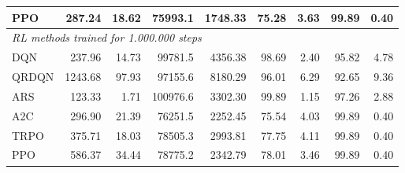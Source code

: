 \begin{samepage}
\begin{center}
\begin{tabular}{l|rr|rr|rr|rr}
    PPO          &   287.24 &    18.62 &    75993.1 &    1748.33 &   75.28 &    3.63 &   99.89 &    0.40 \\
    \midrule
    \multicolumn{9}{l}{\textit{RL methods trained for 1.000.000 steps}} \\
    \midrule
    DQN          &   237.96 &    14.73 &    99781.5 &    4356.38 &   98.69 &    2.40 &   95.82 &    4.78 \\
    QRDQN        &  1243.68 &    97.93 &    97155.6 &    8180.29 &   96.01 &    6.29 &   92.65 &    9.36 \\
    ARS          &   123.33 &     1.71 &   100976.6 &    3302.30 &   99.89 &    1.15 &   97.26 &    2.88 \\
    A2C          &   296.90 &    21.39 &    76251.5 &    2252.45 &   75.54 &    4.03 &   99.89 &    0.40 \\
    TRPO         &   375.71 &    18.03 &    78505.3 &    2993.81 &   77.75 &    4.11 &   99.89 &    0.40 \\
    PPO          &   586.37 &    34.44 &    78775.2 &    2342.79 &   78.01 &    3.46 &   99.89 &    0.40 \\
    \bottomrule
  \end{tabular}
\end{center}
\end{samepage}

